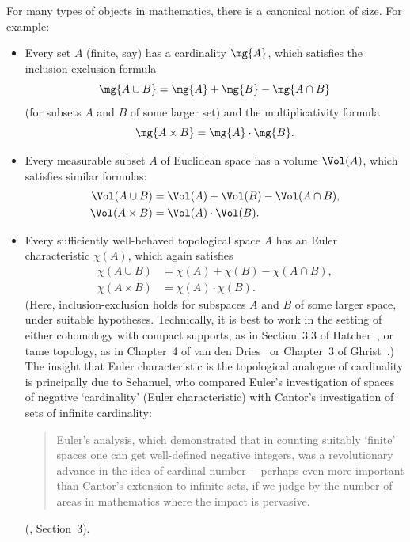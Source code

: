 For many types of objects in mathematics, there is a canonical notion of
size.  For example:
% 
\begin{itemize}
\item 
Every set $A$ (finite, say) has a cardinality $\mg{A}$,
which satisfies the 
inclusion-exclusion%
%
%
formula
\[
\mg{A \cup B} = \mg{A} + \mg{B} - \mg{A \cap B}
\]
(for subsets $A$ and $B$ of some larger set) and the
multiplicativity%
%
% 
formula 
\[
\mg{A \times B} = \mg{A} \cdot \mg{B}.
\]

\item 
Every measurable subset $A$ of Euclidean space has a volume
$\Vol(A)$, which satisfies similar formulas:
% 
\begin{align*}
\Vol(A \cup B)  &
= 
\Vol(A) + \Vol(B) - \Vol(A \cap B),   \\
\Vol(A \times B)        & 
= 
\Vol(A) \cdot \Vol(B).
\end{align*}

\item 
Every sufficiently well-behaved topological space $A$ has an Euler
characteristic%
%
%
$\chi(A)$, which again satisfies
% 
\begin{align*}
\chi(A \cup B)  & 
= 
\chi(A) + \chi(B) - \chi(A \cap B),   \\
\chi(A \times B)        &
=
\chi(A) \cdot \chi(B).
\end{align*}
% 
(Here, inclusion-exclusion holds for subspaces $A$ and $B$ of some larger
space, under suitable hypotheses.  Technically, it is best to work
in the setting of either cohomology with compact supports, as in
Section~3.3 of Hatcher~\cite{Hatc}, or tame topology, as in Chapter~4 of
van den Dries~\cite{VDD} or Chapter~3 of Ghrist~\cite{GhriEAT}.)  The
insight that Euler%
%
% 
characteristic is the topological analogue of cardinality is
principally due to Schanuel, who compared Euler's investigation of spaces
of negative `cardinality' (Euler characteristic) with Cantor's
investigation of sets of infinite cardinality:
% 
\begin{quote}
% 
Euler's analysis, which demonstrated that in counting suitably `finite'
spaces%
%
% 
one can get well-defined negative integers, was a revolutionary advance in
the idea of cardinal number~-- perhaps even more important than Cantor's
extension to infinite sets, if we judge by the number of areas in
mathematics where the impact is pervasive.
\end{quote}
% 
(\cite{SchaNSE}, Section~3).
\end{itemize}

